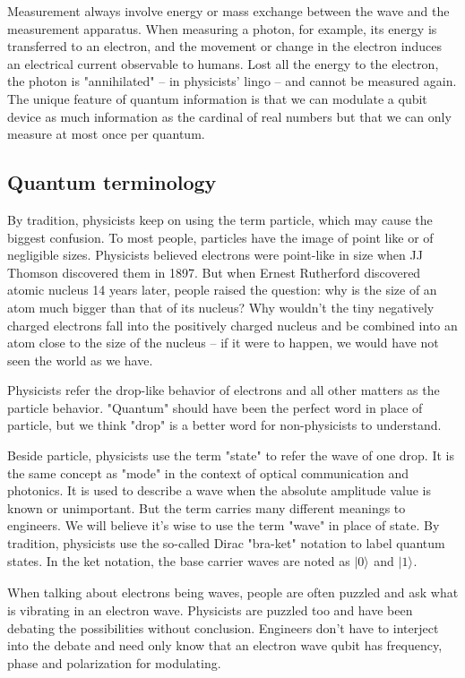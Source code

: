 \documentclass{book}
\newcommand{\keta}[2][]{\vert {#2} \rangle_{#1}}
\begin{document}
Measurement always involve energy or mass exchange between the wave and the measurement apparatus. When measuring a photon, for example, its energy is transferred to an electron, and the movement or change in the electron induces an electrical current observable to humans. Lost all the energy to the electron, the photon is "annihilated" -- in physicists' lingo -- and cannot be measured again. The unique feature of quantum information is that we can modulate a qubit device as much information as the cardinal of real numbers but that we can only measure at most once per quantum.

\subsection{Quantum terminology}
By tradition, physicists keep on using the term particle, which may cause the biggest confusion. To most people, particles have the image of point like or of negligible sizes. Physicists believed electrons were point-like in size when JJ Thomson discovered them in 1897. But when Ernest Rutherford discovered atomic nucleus 14 years later, people raised the question: why is the size of an atom much bigger than that of its nucleus? Why wouldn't the tiny negatively charged electrons fall into the positively charged nucleus and be combined into an atom close to the size of the nucleus -- if it were to happen, we would have not seen the world as we have.

Physicists refer the drop-like behavior of electrons and all other matters as the particle behavior. "Quantum" should have been the perfect word in place of particle, but we think "drop" is a better word for non-physicists to understand.

Beside particle, physicists use the term "state" to refer the wave of one drop. It is the same concept as "mode" in the context of optical communication and photonics. It is used to describe a wave when the absolute amplitude value is known or unimportant. But the term carries many different meanings to engineers. We will believe it's wise to use the term "wave" in place of state. By tradition, physicists use the so-called Dirac "bra-ket" notation to label quantum states. In the ket notation, the base carrier waves are noted as $\keta{0}$ and $\keta{1}$.

When talking about electrons being waves, people are often puzzled and ask what is vibrating in an electron wave. Physicists are puzzled too and have been debating the possibilities without conclusion. Engineers don't have to interject into the debate and need only know that an electron wave qubit has frequency, phase and polarization for modulating.
\end{document}
